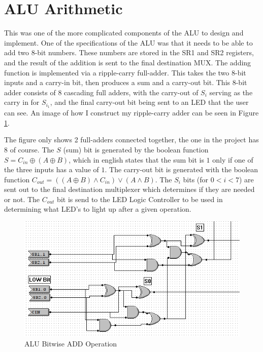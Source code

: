 \documentclass[a4paper,11pt]{article}
\begin{document}
\section{ALU Arithmetic}
This was one of the more complicated components of the ALU to design and implement. One of the specifications of the ALU was that it needs to be able to add two 8-bit numbers. These numbers are stored in the SR1 and SR2 registers, and the result of the addition is sent to the final destination MUX. The adding function is implemented via a ripple-carry full-adder. This takes the two 8-bit inputs and a carry-in bit, then produces a sum and a carry-out bit. This 8-bit adder consists of 8 cascading full adders, with the carry-out of $S_i$ serving as the carry in for $S_{i_1}$, and the final carry-out bit being sent to an LED that the user can see. An image of how I construct my ripple-carry adder can be seen in Figure \ref{fig:addfunction}. \par
The figure only shows 2 full-adders connected together, the one in the project has 8 of course. The $S$ (sum) bit is generated by the boolean function $S = C_{in} \oplus (A \oplus B)$, which in english states that the sum bit is $1$ only if one of the three inputs has a value of $1$. The carry-out bit is generated with the boolean function $C_{out} = ((A \oplus B) \wedge C_{in}) \vee (A \wedge B)$. The $S_i$ bits (for $ 0 < i < 7$) are sent out to the final destination multiplexer which determines if they are needed or not. The $C_{out}$ bit is send to the LED Logic Controller to be used in determining what LED's to light up after a given operation. 

  \begin{figure}[h!]
       \includegraphics[width=5.4in]{pictures/addfunction}
     \caption{ALU Bitwise ADD Operation}
     \label{fig:addfunction}
  \end{figure} 
\end{document}
